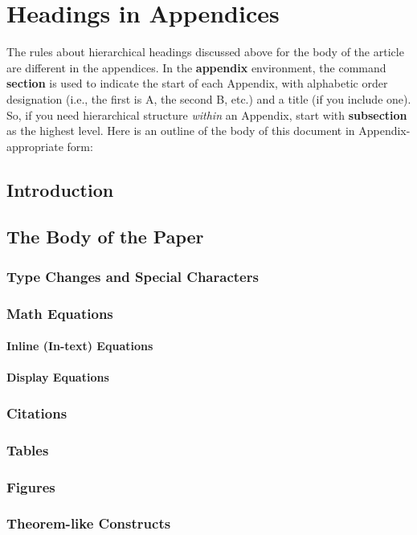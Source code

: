 \appendix
\section{Headings in Appendices}
The rules about hierarchical headings discussed above for
the body of the article are different in the appendices.
In the \textbf{appendix} environment, the command
\textbf{section} is used to
indicate the start of each Appendix, with alphabetic order
designation (i.e., the first is A, the second B, etc.) and
a title (if you include one).  So, if you need
hierarchical structure
\textit{within} an Appendix, start with \textbf{subsection} as the
highest level. Here is an outline of the body of this
document in Appendix-appropriate form:
\subsection{Introduction}
\subsection{The Body of the Paper}
\subsubsection{Type Changes and  Special Characters}
\subsubsection{Math Equations}
\paragraph{Inline (In-text) Equations}
\paragraph{Display Equations}
\subsubsection{Citations}
\subsubsection{Tables}
\subsubsection{Figures}
\subsubsection{Theorem-like Constructs}
